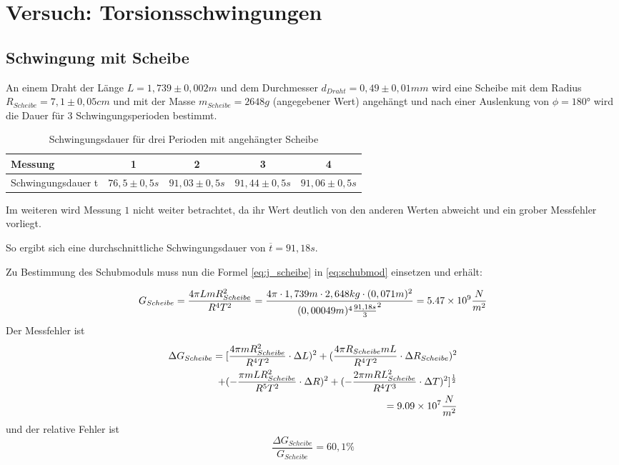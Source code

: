 \section{Versuch: Torsionsschwingungen}
\subsection{Schwingung mit Scheibe}
An einem Draht der Länge $L=1,739 \pm 0,002 m$ und dem Durchmesser $d_{Draht}= 0,49 \pm 0,01 mm$ wird eine Scheibe mit dem Radius $R_{Scheibe}= 7,1 \pm 0,05 cm$ und mit der Masse $m_{Scheibe}=2648g$ (angegebener Wert) angehängt und nach einer Auslenkung von $\phi =180$° wird die Dauer für 3 Schwingungsperioden bestimmt.
\begin{table}[H]
  \centering
  \begin{tabular}{l | c | c | c | c}
    Messung & 1 & 2& 3 & 4 \\ \hline
    Schwingungsdauer t & $76,5 \pm 0,5 s $ & $91,03\pm 0,5 s $ & $91,44 \pm 0,5 s $ & $91,06\pm 0,5 s $
  \end{tabular}
  \caption{Schwingungsdauer für drei Perioden mit angehängter Scheibe}
  \label{tab:schwingdauerscheibe}
\end{table}
Im weiteren wird Messung $1$ nicht weiter betrachtet, da ihr Wert deutlich von den anderen Werten abweicht und ein grober Messfehler vorliegt.

So ergibt sich eine durchschnittliche  Schwingungsdauer von $\overline{t}=91,18s$.

Zu Bestimmung des Schubmoduls muss nun die Formel \ref{eq:j_scheibe} in \ref{eq:schubmod} einsetzen und erhält:

\begin{equation}
G_{Scheibe}=\frac{4\pi LmR_{Scheibe}^2}{R^4T^2}= \frac{4\pi\cdot1,739m\cdot2,648kg\cdot(0,071m)^2}{(0,00049m)^4\frac{91,18s}{3}^2}=\num{5,47d9} \frac{N}{m^2}
\end{equation}
Der Messfehler ist
\begin{equation}
\begin{split}
\Delta G_{Scheibe}=[\frac{4\pi mR_{Scheibe}^2}{R^4T^2}\cdot\Delta L)^2+(\frac{4\pi R_{Scheibe}mL}{R^4T^2}\cdot\Delta R_{Scheibe})^2\\+(-\frac{\pi mLR_{Scheibe}^2}{R^5T^2}\cdot\Delta R)^2+(-\frac{2\pi mRL_{Scheibe}^2}{R^4T^3}\cdot\Delta T)^2]^{\frac{1}{2}}\\=\num{9,09d7}\frac{N}{m^2}
\end{split}
\end{equation}
und der relative Fehler ist
\begin{equation}
\frac{\Delta G_{Scheibe}}{G_{Scheibe}}=60,1\%
\end{equation}
